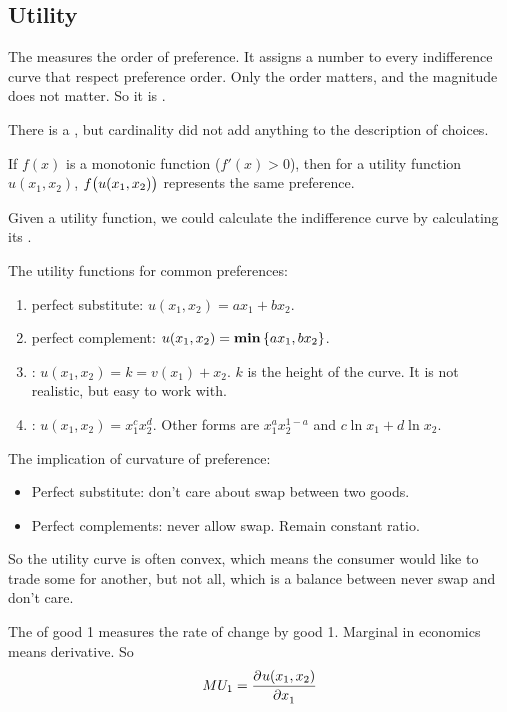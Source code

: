\subsection{Utility}

The  measures the order of preference. It assigns a number to every indifference curve that respect preference order. Only the order matters, and the magnitude does not matter. So it is . 

There is a , but cardinality did not add anything to the description of choices.


\begin{theorem}
    If $f(x)$ is a monotonic function ($f'(x) > 0$), then for a utility function $u(x_1,x_2)$, $f\mleft(u(x_1,x_2)\mright)$ represents the same preference.
\end{theorem}

Given a utility function, we could calculate the indifference curve by calculating its .


The utility functions for common preferences:
\begin{enumerate}
    \item perfect substitute: $u(x_1,x_2) = a x_1 + b x_2$.
    \item perfect complement: $u(x_1,x_2) = \mathbf{min} \set{a x_1, b x_2} $.
    \item {}: $u(x_1,x_2) = k = v(x_1) + x_2$. $k$ is the height of the curve. It is not realistic, but easy to work with.
    \item {}: $u(x_1,x_2) = x_1^c x_2^d$. Other forms are $x_1^a x_2^{1-a}$ and $c \ln x_1 + d \ln x_2$.
\end{enumerate}

The implication of curvature of preference:
\begin{itemize}
    \item Perfect substitute: don't care about swap between two goods.
    \item Perfect complements: never allow swap. Remain constant ratio.
\end{itemize}

So the utility curve is often convex, which means the consumer would like to trade some for another, but not all, which is a balance between never swap and don't care.


The  of good 1 measures the rate of change by good 1. Marginal in economics means derivative. So 
\begin{equation}
    MU_1 = \dpd{u(x_1,x_2)}{x_1}
\end{equation}

